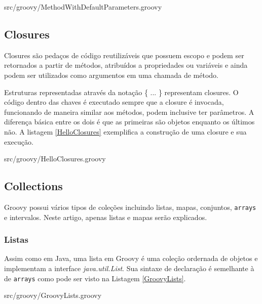 \documentclass[12pt]{article}
\begin{document}
    
                    {src/groovy/MethodWithDefaultParameters.groovy}

\subsection{Closures}

    Closures são pedaços de código reutilizáveis que possuem escopo e podem ser 
    retornados a partir de métodos, atribuídos a propriedades ou variáveis e 
    ainda podem ser utilizados como argumentos em uma chamada de método. 
    
    Estruturas representadas através da notação \{ ... \} representam closures.
    O código dentro das chaves é executado sempre que a closure é invocada, 
    funcionando de maneira similar aos métodos, podem inclusive ter parâmetros. 
    A diferença básica entre os dois é que as primeiras são objetos enquanto os 
    últimos não. A listagem \ref{HelloClosures} exemplifica a construção de uma 
    closure e sua execução.
    
    
                    {src/groovy/HelloClosures.groovy}
    
\subsection{Collections}

    Groovy possui vários tipos de coleções incluindo listas, mapas, conjuntos,
    \texttt{arrays} e intervalos. Neste artigo, apenas listas e mapas serão explicados.
    
\subsubsection{Listas}

    Assim como em Java, uma lista em Groovy é uma coleção ordernada de objetos e 
    implementam a interface \emph{java.util.List}. Sua sintaxe de declaração é 
    semelhante à de \texttt{arrays} como pode ser visto na Listagem \ref{GroovyLists}.
    
    
                    {src/groovy/GroovyLists.groovy}
\end{document}

